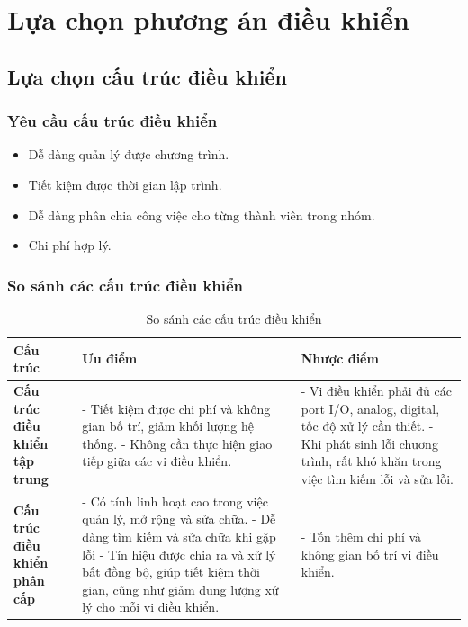         \section{Lựa chọn phương án điều khiển}
            \subsection{Lựa chọn cấu trúc điều khiển}
                \subsubsection{Yêu cầu cấu trúc điều khiển}
                    \begin{itemize}
                        \item Dễ dàng quản lý được chương trình. 
                        \item Tiết kiệm được thời gian lập trình. 
                        \item Dễ dàng phân chia công việc cho từng thành viên trong nhóm.
                        \item Chi phí hợp lý. 
                    \end{itemize}
                \subsubsection{So sánh các cấu trúc điều khiển}
                \begin{table}[H]
                    \centering
                    \caption{So sánh các cấu trúc điều khiển}
                    \label{tab:compare_control_structures}  
                    \begin{tabular}{|p{3cm}|p{4cm}|p{4cm}|}
                        \hline
                        \textbf{Cấu trúc} & \textbf{Ưu điểm} & \textbf{Nhược điểm} \\
                        \hline
                        \textbf{Cấu trúc điều khiển tập trung} & 
                        - Tiết kiệm được chi phí và không gian bố trí, giảm khối lượng hệ thống.\newline
                        - Không cần thực hiện giao tiếp giữa các vi điều khiển. & 
                        - Vi điều khiển phải đủ các port I/O, analog, digital, tốc độ xử lý cần thiết. \newline
                        - Khi phát sinh lỗi chương trình, rất khó khăn trong việc tìm kiếm lỗi và sửa lỗi.  \\ 
                        \hline
                        \textbf{Cấu trúc điều khiển phân cấp} & 
                        - Có tính linh hoạt cao trong việc quản lý, mở rộng và sửa chữa. \newline
                        - Dễ dàng tìm kiếm và sửa chữa khi gặp lỗi \newline
                        - Tín hiệu được chia ra và xử lý bất đồng bộ, giúp tiết kiệm thời gian, cũng như giảm dung lượng xử lý cho mỗi vi điều khiển. & 
                        - Tốn thêm chi phí và không gian bố trí vi điều khiển. \\
                        \hline
                        \end{tabular}
                \end{table}
